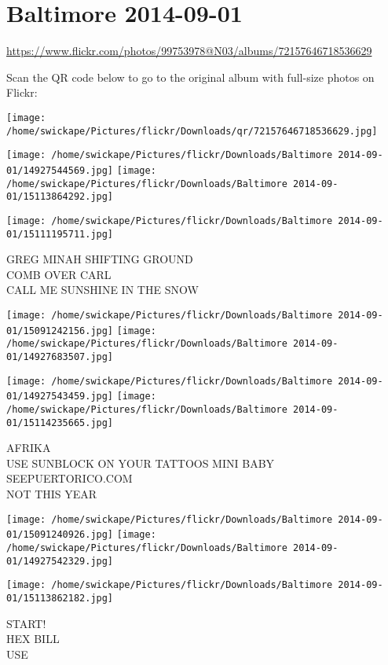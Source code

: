 \documentclass[10pt,letterpaper]{article}
\title{}
\author{}
\date{}
\begin{document}
\section*{Baltimore 2014-09-01}

\url{https://www.flickr.com/photos/99753978@N03/albums/72157646718536629}

Scan the QR code below to go to the original album with full-size photos on Flickr:

\texttt{[image: /home/swickape/Pictures/flickr/Downloads/qr/72157646718536629.jpg]}
\pagebreak

\texttt{[image: /home/swickape/Pictures/flickr/Downloads/Baltimore 2014-09-01/14927544569.jpg]}
\texttt{[image: /home/swickape/Pictures/flickr/Downloads/Baltimore 2014-09-01/15113864292.jpg]}

\vspace{0.25in}
\texttt{[image: /home/swickape/Pictures/flickr/Downloads/Baltimore 2014-09-01/15111195711.jpg]}

GREG MINAH SHIFTING GROUND\\
COMB OVER CARL\\
CALL ME SUNSHINE IN THE SNOW
\pagebreak

\texttt{[image: /home/swickape/Pictures/flickr/Downloads/Baltimore 2014-09-01/15091242156.jpg]}
\texttt{[image: /home/swickape/Pictures/flickr/Downloads/Baltimore 2014-09-01/14927683507.jpg]}

\texttt{[image: /home/swickape/Pictures/flickr/Downloads/Baltimore 2014-09-01/14927543459.jpg]}
\texttt{[image: /home/swickape/Pictures/flickr/Downloads/Baltimore 2014-09-01/15114235665.jpg]}

AFRIKA\\
USE SUNBLOCK ON YOUR TATTOOS MINI BABY\\
SEEPUERTORICO.COM\\
NOT THIS YEAR
\pagebreak

\texttt{[image: /home/swickape/Pictures/flickr/Downloads/Baltimore 2014-09-01/15091240926.jpg]}
\texttt{[image: /home/swickape/Pictures/flickr/Downloads/Baltimore 2014-09-01/14927542329.jpg]}

\vspace{0.25in}
\texttt{[image: /home/swickape/Pictures/flickr/Downloads/Baltimore 2014-09-01/15113862182.jpg]}

START!\\
HEX BILL\\
USE
\pagebreak
\end{document}
